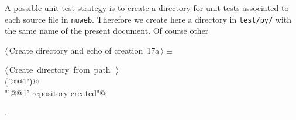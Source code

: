 \documentclass[11pt,oneside]{article}	%
\begin{document}
A possible unit test strategy is to create a directory for unit tests associated to each source file in \texttt{nuweb}. Therefore we create here a directory in \texttt{test/py/} with the same name of the present document. Of course other 

\begin{flushleft} \small
\begin{minipage}{\linewidth} \label{scrap26}
\protect{}$\langle\,$Create directory and echo of creation\nobreak\ {\footnotesize 17a}$\,\rangle\equiv$
\vspace{-1ex}
\begin{list}{}{} \item
\mbox{}\verb@@\hbox{$\langle\,$Create directory from path\nobreak\ {\footnotesize {}}$\,\rangle$}\verb@@\\
\mbox{}\verb@createDir('@@1\verb@')@\\
\mbox{}\verb@print "'@@1\verb@' repository created"@\\
\mbox{}\verb@@{\NWsep}
\end{list}
\vspace{-1ex}
\footnotesize\addtolength{\baselineskip}{-1ex}
\begin{list}{}{\setlength{\itemsep}{-\parsep}\setlength{\itemindent}{-\leftmargin}}
\item {\NWtxtMacroNoRef}.
\end{list}
\end{minipage}\\[4ex]
\end{flushleft}
\end{document}
